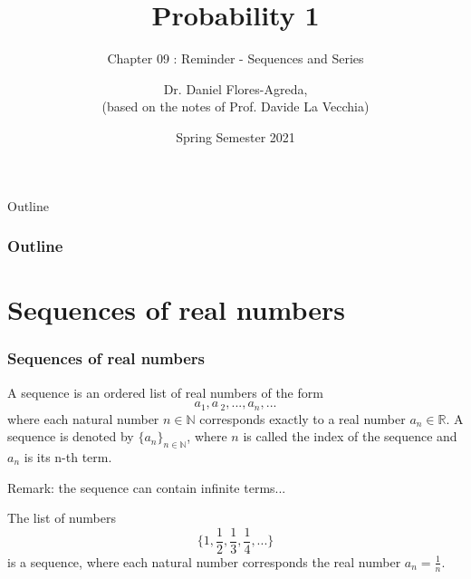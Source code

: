 \documentclass[notes=show,smaller,handout]{beamer}\usepackage[]{graphicx}\usepackage[]{color}
\title[S110015]{Probability 1}
\subtitle{Chapter 09 : Reminder - Sequences and Series}
\author[Flores-Agreda, La Vecchia]{Dr. Daniel Flores-Agreda, \\[0.5em] \tiny{(based on the notes of Prof. Davide La Vecchia)}}
\date{Spring Semester 2021}
\begin{document}
\begin{frame}{Outline}
  \titlepage
\end{frame}



\begin{frame}{\secname}
  \frametitle{Outline}
  \tableofcontents
\end{frame}

\section{Sequences of real numbers }

\begin{frame}{\secname}

\frametitle{Sequences of real numbers }

\begin{definition}
 A sequence is an ordered list of real numbers
of the form%
\begin{equation*}
a_{1},a\,_{2},...,a_{n},...
\end{equation*}
where each natural number $n \in \mathbb{N}$ corresponds exactly to a real number $a_n \in \mathbb{R}$. A sequence is denoted
by $\{a_n \}_{n \in \mathbb{N}}$, where $n$ is called the index of the sequence and $a_n$ is its n-th term.
\end{definition}

\vspace{0.4cm}

Remark: the sequence can contain infinite terms...

\begin{example}
The list of numbers
$$
\Big\{1,\frac{1}{2},\frac{1}{3},\frac{1}{4},... \Big \}
$$
is a sequence, where each natural number corresponds the real number $a_n = \frac{1}{n}$.
\end{example}



\end{frame}

\end{document}
